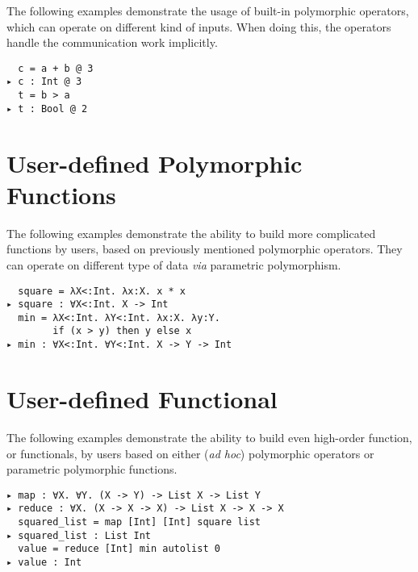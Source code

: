 \documentclass{report}
\begin{document}
The following examples demonstrate the usage of built-in polymorphic operators, which can operate on different kind of inputs. When doing this, the operators handle the communication work implicitly.

\vspace{1em}
\noindent
\verb|  c = a + b @ 3|
\\
\verb|▸ c : Int @ 3|
\\
\verb|  t = b > a|
\\
\verb|▸ t : Bool @ 2|

\section{User-defined Polymorphic Functions}


The following examples demonstrate the ability to build more complicated functions by users, based on previously mentioned polymorphic operators. They can operate on different type of data \emph{via} parametric polymorphism.

\vspace{1em}
\noindent
\verb|  square = λX<:Int. λx:X. x * x|
\\
\verb|▸ square : ∀X<:Int. X -> Int|
\\
\verb|  min = λX<:Int. λY<:Int. λx:X. λy:Y.|
\\
\verb|        if (x > y) then y else x|
\\
\verb|▸ min : ∀X<:Int. ∀Y<:Int. X -> Y -> Int|

\section{User-defined Functional}

The following examples demonstrate the ability to build even high-order function, or functionals, by users based on either (\emph{ad hoc}) polymorphic operators or parametric polymorphic functions.

\vspace{1em}
\noindent
\verb|▸ map : ∀X. ∀Y. (X -> Y) -> List X -> List Y|
\\
\verb|▸ reduce : ∀X. (X -> X -> X) -> List X -> X -> X|
\\
\verb|  squared_list = map [Int] [Int] square list|
\\
\verb|▸ squared_list : List Int|
\\
\verb|  value = reduce [Int] min autolist 0|
\\
\verb|▸ value : Int|
\end{document}
